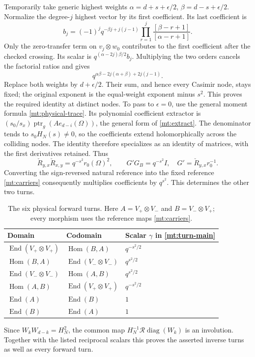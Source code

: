 \documentclass[11pt]{article}
\numberwithin{equation}{section}
\theoremstyle{definition}\newtheorem{definition}[theorem]{Definition}
\theoremstyle{remark}\newtheorem{remark}[theorem]{Remark}
\newcommand{\End}{\operatorname{End}}
\newcommand{\Hom}{\operatorname{Hom}}
\newcommand{\ptr}{\operatorname{ptr}}
\newcommand{\diag}{\operatorname{diag}}
\newcommand{\Rrev}{\mathcal R}
\begin{document}
Temporarily take generic highest weights
$\alpha=d+s+\epsilon/2$, $\beta=d-s+\epsilon/2$.
Normalize the degree-$j$ highest vector by its first coefficient.
Its last coefficient is
\[
 b_j=(-1)^jq^{-\beta j+j(j-1)}
           \prod_{r=1}^j\frac{[\beta-r+1]}{[\alpha-r+1]}.
\]
Only the zero-transfer term on $v_j\otimes w_0$ contributes to the
first coefficient after the checked crossing. Its scalar is
$q^{(\alpha-2j)\beta/2}b_j$. Multiplying the two orders cancels the
factorial ratios and gives
\[
 q^{\alpha\beta-2j(\alpha+\beta)+2j(j-1)}.
\]
Replace both weights by $d+\epsilon/2$. Their sum, and hence every
Casimir node, stays fixed; the original exponent is the equal-weight
exponent minus $s^2$. This proves the required identity at distinct
nodes. To pass to $\epsilon=0$, use the general moment formula
\eqref{mt:physical-trace}. Its polynomial coefficient extractor is
$(s_0/s_x)\ptr_g(Ae_{d-i}(\Omega))$, the general form of
\eqref{mt:extract}. The denominator tends to
$s_0H_N(s)\ne0$, so the coefficients extend holomorphically across
the colliding nodes. The identity therefore specializes as an
identity of matrices, with the first derivatives retained. Thus
\begin{equation}\label{mt:monodromy}
 \check R_{y,x}\check R_{x,y}=q^{-s^2}r_0(\Omega)^2,
 \qquad G'G_B=q^{-s^2}I,\quad G'=\check R_{y,x}r_0^{-1}.
\end{equation}
Converting the sign-reversed natural reference into the fixed
reference \eqref{mt:carriers} consequently multiplies coefficients
by $q^{s^2}$. This determines the other two turns.

\begin{table}[ht]
\centering
\begin{tabular}{lll}\toprule
Domain & Codomain & Scalar $\gamma$ in \eqref{mt:turn-main}\\\midrule
$\End(V_+\otimes V_+)$ & $\Hom(B,A)$ & $q^{-s^2/2}$\\
$\Hom(B,A)$ & $\End(V_-\otimes V_-)$ & $q^{s^2/2}$\\
$\End(V_-\otimes V_-)$ & $\Hom(A,B)$ & $q^{s^2/2}$\\
$\Hom(A,B)$ & $\End(V_+\otimes V_+)$ & $q^{-s^2/2}$\\
$\End(A)$ & $\End(B)$ & $1$\\
$\End(B)$ & $\End(A)$ & $1$\\\bottomrule
\end{tabular}
\caption{The six physical forward turns. Here $A=V_+\otimes V_-$
and $B=V_-\otimes V_+$; every morphism uses the reference maps
\eqref{mt:carriers}.}\label{mt:types}
\end{table}
Since $W_kW_{d-k}=H_N^2$, the common map
$H_N^{-1}\Rrev\diag(W_k)$ is an involution. Together with the
listed reciprocal scalars this proves the asserted inverse turns
as well as every forward turn.
\end{document}
